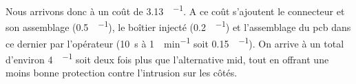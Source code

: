 Nous arrivons donc à un coût de \SI{3.13}{\chf\per\piece}.
A ce coût s'ajoutent le connecteur et son assemblage (\SI{0.5}{\chf\per\piece}), le boîtier injecté (\SI{0.2}{\chf\per\piece}) et l'assemblage du \gls{pcb} dans ce dernier par l'opérateur
(\SI{10}{\second} à \SI{1}{\chf\per\minute} soit \SI{0.15}{\chf\per\piece}).
On arrive à un total d'environ \SI{4}{\chf\per\piece} soit deux fois plus que l'alternative \gls{mid}, tout en offrant une moins bonne protection contre l'intrusion sur les côtés.


